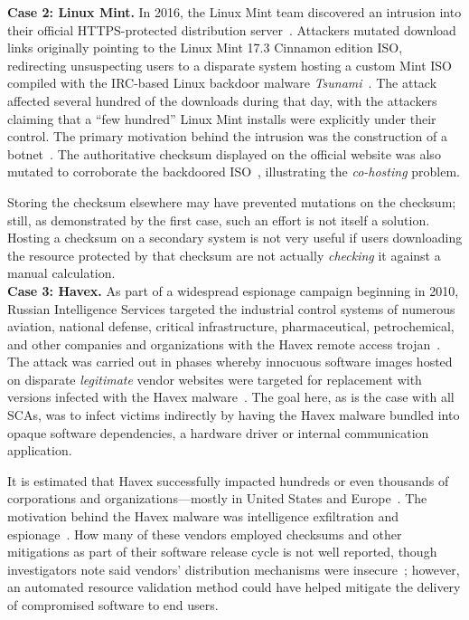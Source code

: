 \noindent\textbf{Case 2: Linux Mint.} In 2016, the Linux Mint team discovered an
intrusion into their official HTTPS-protected distribution
server~\cite{SCA-MINT1}. Attackers mutated download links originally pointing to
the Linux Mint 17.3 Cinnamon edition ISO, redirecting unsuspecting users to a
disparate system hosting a custom Mint ISO compiled with the IRC-based Linux
backdoor malware \emph{Tsunami}~\cite{SCA-MINT2}. The attack affected several
hundred of the downloads during that day, with the attackers claiming that a
``few hundred'' Linux Mint installs were explicitly under their control. The
primary motivation behind the intrusion was the construction of a
botnet~\cite{SCA-MINT3}. The authoritative checksum displayed on the official
website was also mutated to corroborate the backdoored ISO~\cite{SCA-MINT3},
illustrating the \emph{co-hosting} problem.

Storing the checksum elsewhere may have prevented mutations on the checksum;
still, as demonstrated by the first case, such an effort is not itself a
solution. Hosting a checksum on a secondary system is not very useful if users
downloading the resource protected by that checksum are not actually
\emph{checking} it against a manual calculation. \\

\noindent\textbf{Case 3: Havex.} As part of a widespread espionage campaign
beginning in 2010, Russian Intelligence Services targeted the industrial control
systems of numerous aviation, national defense, critical infrastructure,
pharmaceutical, petrochemical, and other companies and organizations with the
Havex remote access trojan~\cite{SCA-HAVEX1, SCA-HAVEX2}. The attack was carried
out in phases whereby innocuous software images hosted on disparate
\emph{legitimate} vendor websites were targeted for replacement with versions
infected with the Havex malware~\cite{SCA-HAVEX2}. The goal here, as is the case
with all SCAs, was to infect victims indirectly by having the Havex malware
bundled into opaque software dependencies, \ie a hardware driver or internal
communication application.

It is estimated that Havex successfully impacted hundreds or even thousands of
corporations and organizations---mostly in United States and
Europe~\cite{SCA-HAVEX2}. The motivation behind the Havex malware was
intelligence exfiltration and espionage~\cite{SCA-HAVEX1}. How many of these
vendors employed checksums and other mitigations as part of their software
release cycle is not well reported, though investigators note said vendors'
distribution mechanisms were insecure~\cite{SCA-HAVEX2}; however, an automated
resource validation method could have helped mitigate the
delivery of compromised software to end users. \\

